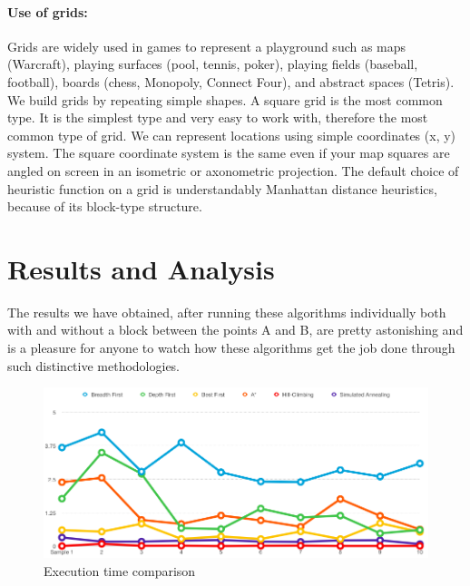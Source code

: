 \documentclass[a4paper]{article}
\begin{document}
\paragraph{Use of grids:} Grids are widely used in games to represent a playground such as maps (Warcraft), playing surfaces (pool, tennis, poker), playing fields (baseball, football), boards (chess, Monopoly, Connect Four), and abstract spaces (Tetris). \\

We build grids by repeating simple shapes. A square grid is the most common type. It is the simplest type and very easy to work with, therefore the most common type of grid. We can represent locations using simple coordinates (x, y) system. The square coordinate system is the same even if your map squares are angled on screen in an isometric or axonometric projection. The default choice of heuristic function on a grid is understandably Manhattan distance heuristics, because of its block-type structure.


\section{Results and Analysis}

The results we have obtained, after running these algorithms individually both with and without a block between the points A and B, are pretty astonishing and is a pleasure for anyone to watch how these algorithms get the job done through such distinctive methodologies.\\

\begin{figure}[h!]
  \centering
    \includegraphics[scale=.4]{images/execution_time.png}
  \caption{Execution time comparison}
\end{figure}
\end{document}
